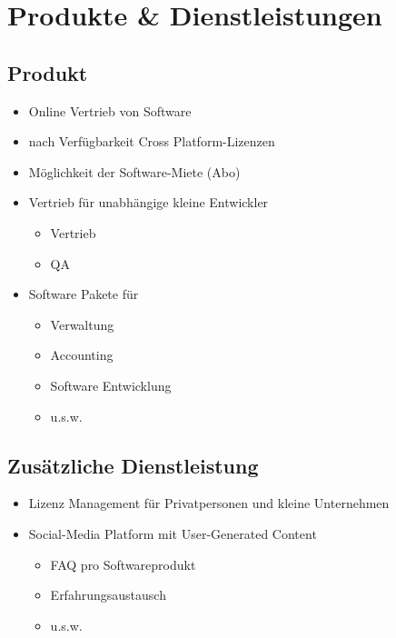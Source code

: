 \chapter{Produkte \& Dienstleistungen}

\section{Produkt}
	\begin{itemize}
		\item Online Vertrieb von Software
		\item nach Verf\"ugbarkeit Cross Platform-Lizenzen
		\item M\"oglichkeit der Software-Miete (Abo)
		\item Vertrieb f\"ur unabh\"angige kleine Entwickler
		\begin{itemize}
			\item Vertrieb
			\item QA
		\end{itemize}
		\item Software Pakete f\"ur
			\begin{itemize}
				\item Verwaltung
				\item Accounting
				\item Software Entwicklung
				\item u.s.w.
			\end{itemize}
	\end{itemize}
	
\section{Zus\"atzliche Dienstleistung}
	\begin{itemize}
		\item Lizenz Management f\"ur Privatpersonen und kleine Unternehmen
		\item Social-Media Platform mit User-Generated Content
		\begin{itemize}
			\item FAQ pro Softwareprodukt
			\item Erfahrungsaustausch
			\item u.s.w.
		\end{itemize}
	\end{itemize}